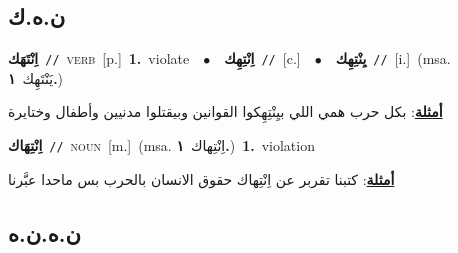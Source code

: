\documentclass[10pt,a4paper,twoside]{article} %
\begin{document}
\begin{multicols}{2}
\vspace{-3mm}
\subsection*{\color{blue}\foreignlanguage{arabic}{ن.ه.ك}\color{blue}{}} 

{\setlength\topsep{0pt}\textbf{\foreignlanguage{arabic}{اِنْتَهَك}}\ {\color{gray}\texttt{//}\color{black}}\ \textsc{verb}\ [p.]\ \textbf{1.}~violate\ \ $\bullet$\ \ \setlength\topsep{0pt}\textbf{\foreignlanguage{arabic}{اِنْتِهِك}}\ {\color{gray}\texttt{//}\color{black}}\ [c.]\ \ $\bullet$\ \ \setlength\topsep{0pt}\textbf{\foreignlanguage{arabic}{يِنْتِهِك}}\ {\color{gray}\texttt{//}\color{black}}\ [i.]\ \color{gray}(msa. \foreignlanguage{arabic}{يَنْتَهِك}~\foreignlanguage{arabic}{\textbf{١.}})\color{black}\  \begin{flushright}\color{gray}\foreignlanguage{arabic}{\textbf{\underline{\foreignlanguage{arabic}{أمثلة}}}: بكل حرب همي اللي بيِنْتِهِكوا القوانين وبيقتلوا مدنيين وأطفال وختايرة}\end{flushright}\color{black}} \vspace{2mm}

{\setlength\topsep{0pt}\textbf{\foreignlanguage{arabic}{اِنْتِهَاك}}\ {\color{gray}\texttt{//}\color{black}}\ \textsc{noun}\ [m.]\ \color{gray}(msa. \foreignlanguage{arabic}{اِنْتِهاك}~\foreignlanguage{arabic}{\textbf{١.}})\color{black}\ \textbf{1.}~violation\  \begin{flushright}\color{gray}\foreignlanguage{arabic}{\textbf{\underline{\foreignlanguage{arabic}{أمثلة}}}: كتبنا تقربر عن اِنْتِهاك حقوق الانسان بالحرب بس ماحدا عبَّرنا}\end{flushright}\color{black}} \vspace{2mm}

\vspace{-3mm}
\subsection*{\color{blue}\foreignlanguage{arabic}{ن.ه.ن.ه}\color{blue}{}} 


\end{multicols}
\end{document}
